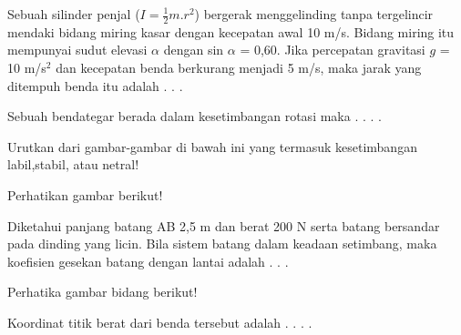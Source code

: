 \item Sebuah silinder penjal ($I=\frac{1}{2} m.r^2$) bergerak menggelinding tanpa tergelincir mendaki bidang miring kasar dengan kecepatan awal 10 m/s. Bidang miring itu mempunyai sudut elevasi $\alpha$ dengan sin $\alpha$ = 0,60. Jika percepatan gravitasi $g$ = 10 m/s$^2$ dan kecepatan benda berkurang menjadi 5 m/s, maka jarak yang ditempuh benda itu adalah . . . 

\item Sebuah bendategar berada dalam kesetimbangan rotasi maka . . . .

\item Urutkan dari gambar-gambar di bawah ini yang termasuk kesetimbangan labil,stabil, atau netral!

\item Perhatikan gambar berikut!

Diketahui panjang batang AB 2,5 m dan berat 200 N serta batang bersandar pada dinding yang licin. Bila sistem batang dalam keadaan setimbang, maka koefisien gesekan batang dengan lantai adalah . . . 

\item Perhatika gambar bidang berikut!

Koordinat titik berat dari benda tersebut adalah . . . .

